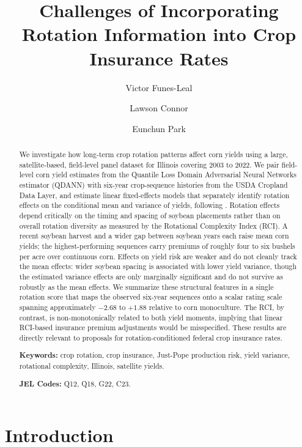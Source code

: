 \documentclass[12pt,letterpaper]{article}
\title{Challenges of Incorporating Rotation Information into Crop Insurance Rates}
\author[1]{Victor Funes-Leal}
\author[2]{Lawson Connor}
\author[3]{Eunchun Park}
\affil[1,2,3]{Department of Agricultural Economics and Agribusiness, University of Arkansas}
\date{}
\theoremstyle{remark}
\theoremstyle{remark}
\theoremstyle{plain}
\theoremstyle{definition}
\begin{document}
\maketitle
\begin{abstract}
\noindent
We investigate how long-term crop rotation patterns affect corn yields using a large, satellite-based, field-level panel dataset for Illinois covering 2003 to 2022. We pair field-level corn yield estimates from the Quantile Loss Domain Adversarial Neural Networks estimator (QDANN) with six-year crop-sequence histories from the USDA Cropland Data Layer, and estimate linear fixed-effects models that separately identify rotation effects on the conditional mean and variance of yields, following \citet{Just1979}. Rotation effects depend critically on the timing and spacing of soybean placements rather than on overall rotation diversity as measured by the Rotational Complexity Index (RCI). A recent soybean harvest and a wider gap between soybean years each raise mean corn yields; the highest-performing sequences carry premiums of roughly four to six bushels per acre over continuous corn. Effects on yield risk are weaker and do not cleanly track the mean effects: wider soybean spacing is associated with lower yield variance, though the estimated variance effects are only marginally significant and do not survive as robustly as the mean effects. We summarize these structural features in a single rotation score that maps the observed six-year sequences onto a scalar rating scale spanning approximately $-2.68$ to $+1.88$ relative to corn monoculture. The RCI, by contrast, is non-monotonically related to both yield moments, implying that linear RCI-based insurance premium adjustments would be misspecified. These results are directly relevant to proposals for rotation-conditioned federal crop insurance rates.
 
\medskip\noindent
\textbf{Keywords:} crop rotation, crop insurance, Just-Pope production risk, yield variance, rotational complexity, Illinois, satellite yields.
 
\medskip\noindent
\textbf{JEL Codes:} Q12, Q18, G22, C23.
\end{abstract}
 
\newpage
\setcounter{page}{1}
	
\section{\label{sec:intro}Introduction}
\end{document}
